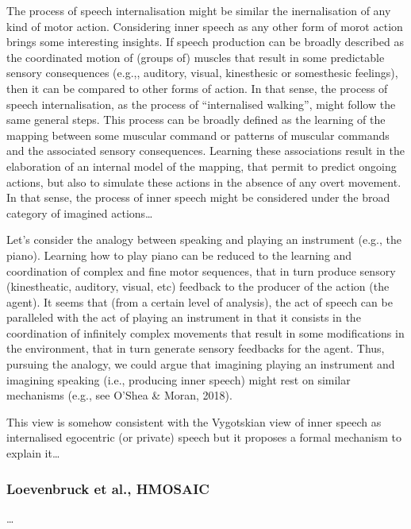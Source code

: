 \documentclass[a4paper,12pt,twoside,openright,oldfontcommands]{memoir}
\begin{document}
The process of speech internalisation might be similar the inernalisation of any kind of motor action. Considering inner speech as any other form of morot action brings some interesting insights. If speech production can be broadly described as the coordinated motion of (groups of) muscles that result in some predictable sensory consequences (e.g.,, auditory, visual, kinesthesic or somesthesic feelings), then it can be compared to other forms of action. In that sense, the process of speech internalisation, as the process of \enquote{internalised walking}, might follow the same general steps. This process can be broadly defined as the learning of the mapping between some muscular command or patterns of muscular commands and the associated sensory consequences. Learning these associations result in the elaboration of an internal model of the mapping, that permit to predict ongoing actions, but also to simulate these actions in the absence of any overt movement. In that sense, the process of inner speech might be considered under the broad category of imagined actions\ldots{}

Let's consider the analogy between speaking and playing an instrument (e.g., the piano). Learning how to play piano can be reduced to the learning and coordination of complex and fine motor sequences, that in turn produce sensory (kinestheatic, auditory, visual, etc) feedback to the producer of the action (the agent). It seems that (from a certain level of analysis), the act of speech can be paralleled with the act of playing an instrument in that it consists in the coordination of infinitely complex movements that result in some modifications in the environment, that in turn generate sensory feedbacks for the agent. Thus, pursuing the analogy, we could argue that imagining playing an instrument and imagining speaking (i.e., producing inner speech) might rest on similar mechanisms (e.g., see O'Shea \& Moran, 2018).

This view is somehow consistent with the Vygotskian view of inner speech as internalised egocentric (or private) speech but it proposes a formal mechanism to explain it\ldots{}

\hypertarget{loevenbruck-et-al.-hmosaic}{%
\subsubsection{Loevenbruck et al., HMOSAIC}\label{loevenbruck-et-al.-hmosaic}}

\ldots{}
\end{document}
